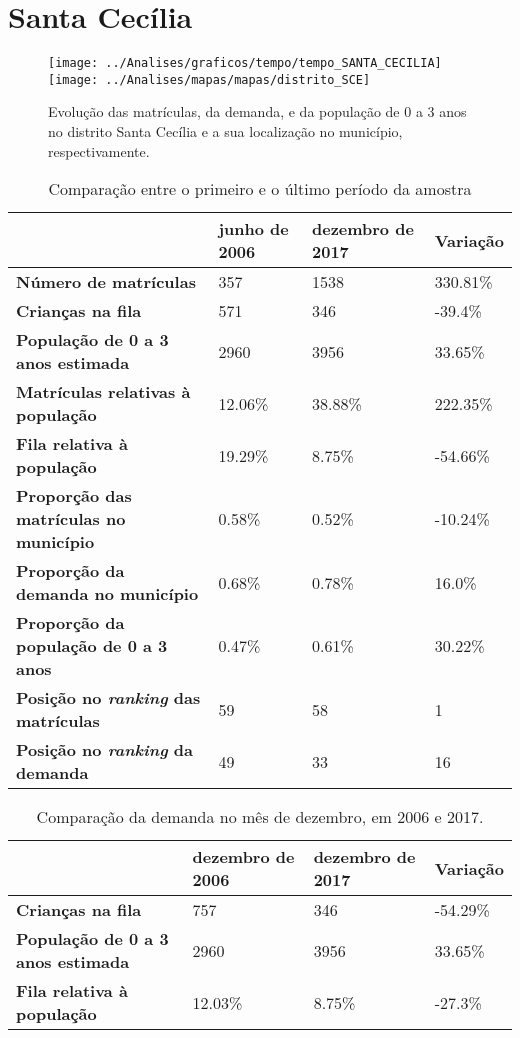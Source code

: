 \section{Santa Cecília}
\begin{figure}[H]
\centering
\texttt{[image: ../Analises/graficos/tempo/tempo\_SANTA\_CECILIA]}
\texttt{[image: ../Analises/mapas/mapas/distrito\_SCE]}
\caption{Evolução das matrículas, da demanda, e da população de 0 a 3 anos no distrito Santa Cecília e a sua localização no município, respectivamente.}
\end{figure}
\begin{table}[H]
\begin{tabular}{l|l|l|l}
\textbf{}                                      & \textbf{junho de 2006}       & \textbf{dezembro de 2017}    & \textbf{Variação} \\ \hline
\textbf{Número de matrículas}                  & 357 & 1538 & 330.81\% \\ \hline
\textbf{Crianças na fila}                      & 571 & 346 & -39.4\% \\ \hline
\textbf{População de 0 a 3 anos estimada}      & 2960 & 3956 & 33.65\% \\ \hline
\textbf{Matrículas relativas à população}      & 12.06\% & 38.88\% & 222.35\% \\ \hline
\textbf{Fila relativa à população}             & 19.29\% & 8.75\% & -54.66\% \\ \hline
\textbf{Proporção das matrículas no município} & 0.58\% & 0.52\% & -10.24\% \\ \hline
\textbf{Proporção da demanda no município}     & 0.68\% & 0.78\% & 16.0\% \\ \hline
\textbf{Proporção da população de 0 a 3 anos}  & 0.47\% & 0.61\% & 30.22\% \\ \hline
\textbf{Posição no \textit{ranking} das matrículas}     & 59 & 58 & 1 \\ \hline
\textbf{Posição no \textit{ranking} da demanda}         & 49 & 33 & 16 \\ 
\end{tabular}
\caption{Comparação entre o primeiro e o último período da amostra}
\end{table}
\begin{table}[H]
\begin{tabular}{l|l|l|l}
\textbf{}                                 & \textbf{dezembro de 2006} & \textbf{dezembro de 2017} & \textbf{Variação} \\ \hline
\textbf{Crianças na fila}                      & 757 & 346 & -54.29\% \\ \hline
\textbf{População de 0 a 3 anos estimada}      & 2960 & 3956 & 33.65\% \\ \hline
\textbf{Fila relativa à população}             & 12.03\% & 8.75\% & -27.3\% \\
\end{tabular}
\caption{Comparação da demanda no mês de dezembro, em 2006 e 2017.}
\end{table}
